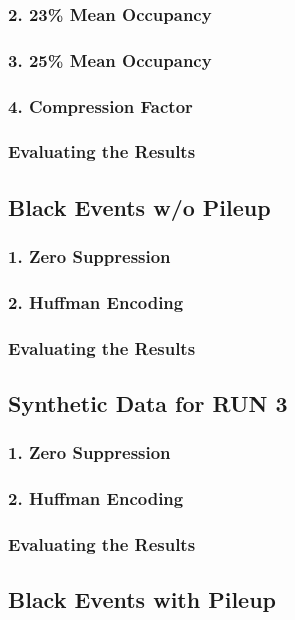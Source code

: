 \documentclass[a4paper, 12pt]{report}
\begin{document}
\subsubsection{2. 23\% Mean Occupancy}
\subsubsection{3. 25\% Mean Occupancy}
\subsubsection{4. Compression Factor}
\subsubsection{Evaluating the Results}

\subsection{Black Events w/o Pileup}
\subsubsection{1. Zero Suppression}
\subsubsection{2. Huffman Encoding}
\subsubsection{Evaluating the Results}

\subsection{Synthetic Data for RUN 3}
\subsubsection{1. Zero Suppression}
\subsubsection{2. Huffman Encoding}
\subsubsection{Evaluating the Results}

\subsection{Black Events with Pileup}
\end{document}

